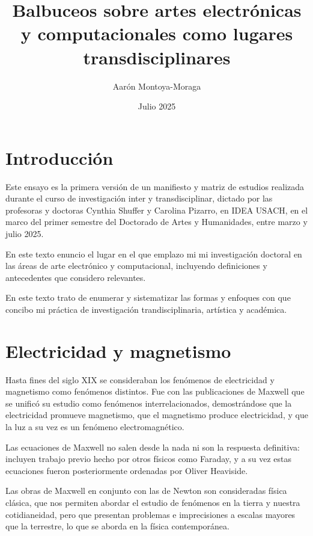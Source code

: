 \documentclass{article}
\title{Balbuceos sobre artes electrónicas y computacionales como lugares transdisciplinares}
\author{Aarón Montoya-Moraga}
\date{Julio 2025}
\begin{document}
\maketitle

\renewcommand*\contentsname{Tabla de contenidos}

\tableofcontents

\clearpage


\section{Introducción}

Este ensayo es la primera versión de un manifiesto y matriz de estudios realizada durante el curso de investigación inter y transdisciplinar, dictado por las profesoras y doctoras Cynthia Shuffer y Carolina Pizarro, en IDEA USACH, en el marco del primer semestre del Doctorado de Artes y Humanidades, entre marzo y julio 2025.

En este texto enuncio el lugar en el que emplazo mi mi investigación doctoral en las áreas de arte electrónico y computacional, incluyendo definiciones y antecedentes que considero relevantes.

En este texto trato de enumerar y sistematizar las formas y enfoques con que concibo mi práctica de investigación trandisciplinaria, artística y académica.

\clearpage

\section{Electricidad y magnetismo}

Hasta fines del siglo XIX se consideraban los fenómenos de electricidad y magnetismo como fenómenos distintos. Fue con las publicaciones de Maxwell que se unificó su estudio como fenómenos interrelacionados, demostrándose que la electricidad promueve magnetismo, que el magnetismo produce electricidad, y que la luz a su vez es un fenómeno electromagnético.

Las ecuaciones de Maxwell no salen desde la nada ni son la respuesta definitiva: incluyen trabajo previo hecho por otros físicos como Faraday, y a su vez estas ecuaciones fueron posteriormente ordenadas por Oliver Heaviside.

Las obras de Maxwell en conjunto con las de Newton son consideradas física clásica, que nos permiten abordar el estudio de fenómenos en la tierra y nuestra cotidianeidad, pero que presentan problemas e imprecisiones a escalas mayores que la terrestre, lo que se aborda en la física contemporánea.
\end{document}
